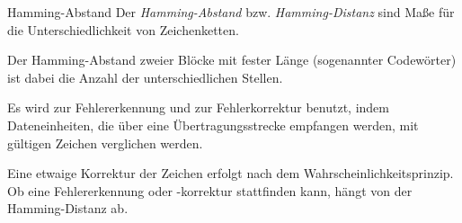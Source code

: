 \begin{defi}{Hamming-Abstand}
    Der \emph{Hamming-Abstand} bzw. \emph{Hamming-Distanz} sind Maße für die Unterschiedlichkeit von Zeichenketten.

    Der Hamming-Abstand zweier Blöcke mit fester Länge (sogenannter Codewörter) ist dabei die Anzahl der unterschiedlichen Stellen.

    Es wird zur Fehlererkennung und zur Fehlerkorrektur benutzt, indem Dateneinheiten, die über eine Übertragungsstrecke empfangen werden, mit gültigen Zeichen verglichen werden.

    Eine etwaige Korrektur der Zeichen erfolgt nach dem Wahrscheinlichkeitsprinzip.
    Ob eine Fehlererkennung oder -korrektur stattfinden kann, hängt von der Hamming-Distanz ab.
\end{defi}

